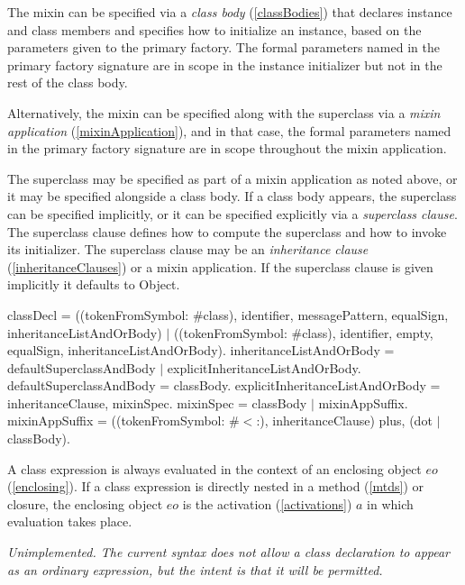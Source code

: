 \documentclass{article}
\newcommand{\code}[1]{{\sf #1}}
\begin{document}
The mixin can be specified via a {\em class body} (\ref{classBodies}) that declares instance and
class members and specifies how to initialize an instance, based on
the parameters given to the primary factory.  The formal parameters named in the
primary factory signature are in scope in the instance initializer but not in the rest of the class body. 

Alternatively, the mixin can be
specified along with the superclass via a {\em mixin application} (\ref{mixinApplication}), and in
that case,  the formal parameters named in the
primary factory signature are in scope throughout the mixin application.

The superclass may be specified as part of a mixin application as
noted above, or it may be specified alongside a
class body. If a class body appears, the superclass can be specified
implicitly, or it can be specified explicitly via a {\em superclass clause}.  The superclass clause defines how
to compute the superclass and how to invoke its initializer. The
superclass clause may be an {\em inheritance clause} (\ref{inheritanceClauses}) or a mixin
application. If the superclass clause is given implicitly
it defaults to \code{Object}.  

 \begin{newspeak}
 classDecl = ((tokenFromSymbol: \#class), identifier, messagePattern, equalSign, 
                     inheritanceListAndOrBody) $|$
                  ((tokenFromSymbol: \#class), identifier, empty, equalSign,
                     inheritanceListAndOrBody).
inheritanceListAndOrBody = defaultSuperclassAndBody $|$ 
                                     explicitInheritanceListAndOrBody.
defaultSuperclassAndBody = classBody.
explicitInheritanceListAndOrBody = inheritanceClause, mixinSpec.
mixinSpec =  classBody $|$ mixinAppSuffix.
mixinAppSuffix = ((tokenFromSymbol: \#$<$:),  inheritanceClause) plus,  
                      (dot $|$ classBody).
\end{newspeak}

A class expression is always evaluated in the context of an enclosing object $eo$  (\ref{enclosing}). If a class expression is directly nested in a method (\ref{mtds}) or closure, the enclosing object $eo$ is the activation (\ref{activations}) $a$ in which evaluation takes place.
 
 {\it Unimplemented. The current syntax does not allow a class declaration to appear as an ordinary expression, but the intent is that it will be permitted.
 }
 
\end{document}
